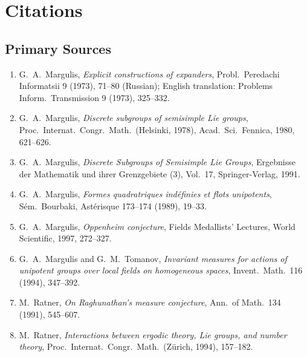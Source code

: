 \section{Citations}\subsection*{Primary Sources}
\begin{enumerate}
    \item G.\ A.\ Margulis, \textit{Explicit constructions of expanders}, Probl.\ Peredachi Informatsii 9 (1973), 71--80 (Russian); English translation: Problems Inform.\ Transmission 9 (1973), 325--332.
    \item G.\ A.\ Margulis, \textit{Discrete subgroups of semisimple Lie groups}, Proc.\ Internat.\ Congr.\ Math.\ (Helsinki, 1978), Acad.\ Sci.\ Fennica, 1980, 621--626.
    \item G.\ A.\ Margulis, \textit{Discrete Subgroups of Semisimple Lie Groups}, Ergebnisse der Mathematik und ihrer Grenzgebiete (3), Vol.\ 17, Springer-Verlag, 1991.
    \item G.\ A.\ Margulis, \textit{Formes quadratriques ind\'efinies et flots unipotents}, S\'em.\ Bourbaki, Ast\'erisque 173--174 (1989), 19--33.
    \item G.\ A.\ Margulis, \textit{Oppenheim conjecture}, Fields Medallists' Lectures, World Scientific, 1997, 272--327.
    \item G.\ A.\ Margulis and G.\ M.\ Tomanov, \textit{Invariant measures for actions of unipotent groups over local fields on homogeneous spaces}, Invent.\ Math.\ 116 (1994), 347--392.
    \item M.\ Ratner, \textit{On Raghunathan's measure conjecture}, Ann.\ of Math.\ 134 (1991), 545--607.
    \item M.\ Ratner, \textit{Interactions between ergodic theory, Lie groups, and number theory}, Proc.\ Internat.\ Congr.\ Math.\ (Z\"urich, 1994), 157--182.
\end{enumerate}

